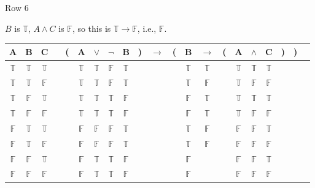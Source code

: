 \documentclass[
  ignorenonframetext,
]{beamer}
\renewcommand{\,}{\text{, }}
\def\True{\mathbb{T}}
\def\False{\mathbb{F}}
\begin{document}
\begin{frame}{Row 6}
\protect\hypertarget{row-6}{}

\(B\) is \(\True\), \(A \wedge C\) is \(\False\), so this is
\(\True \rightarrow \False\), i.e., \(\False\).

\begin{center}
\bigskip
\begin{tabular}{@{ }c@{ }@{ }c@{ }@{ }c | c@{ }@{}c@{}@{ }c@{ }@{ }c@{ }@{ }c@{ }@{ }c@{ }@{}c@{}@{ }c@{ }@{}c@{}@{ }c@{ }@{ }c@{ }@{}c@{}@{ }c@{ }@{ }c@{ }@{ }c@{ }@{}c@{}@{}c@{}@{ }c}
A & B & C &  & ( & A & $\vee$ & $\neg$ & B & ) & $\rightarrow$ & ( & B & $\rightarrow$ & ( & A & $\wedge$ & C & ) & ) & \\
\hline 
 $\True$ & $\True$ & $\True$ &  &  & $\True$ & $\True$ & $\False$ & $\True$ &  &&  & $\True$ & $\True$ &  & $\True$ & $\True$ & $\True$ &  &  & \\
 $\True$ & $\True$ & $\False$ &  &  & $\True$ & $\True$ & $\False$ & $\True$ &  &&  & $\True$ & $\False$ &  & $\True$ & $\False$ & $\False$ &  &  & \\
 $\True$ & $\False$ & $\True$ &  &  & $\True$ & $\True$ & $\True$ & $\False$ &  &&  & $\False$ & $\True$ &  & $\True$ & $\True$ & $\True$ &  &  & \\
 $\True$ & $\False$ & $\False$ &  &  & $\True$ & $\True$ & $\True$ & $\False$ &  &&  & $\False$ & $\True$ &  & $\True$ & $\False$ & $\False$ &  &  & \\
 $\False$ & $\True$ & $\True$ &  &  & $\False$ & $\False$ & $\False$ & $\True$ &  &&  & $\True$ & $\False$ &  & $\False$ & $\False$ & $\True$ &  &  & \\
 $\False$ & $\True$ & $\False$ &  &  & $\False$ & $\False$ & $\False$ & $\True$ &  &&  & $\True$ & $\False$ &  & $\False$ & $\False$ & $\False$ &  &  & \\
 $\False$ & $\False$ & $\True$ &  &  & $\False$ & $\True$ & $\True$ & $\False$ &  &&  & $\False$ &&  & $\False$ & $\False$ & $\True$ &  &  & \\
 $\False$ & $\False$ & $\False$ &  &  & $\False$ & $\True$ & $\True$ & $\False$ &  &&  & $\False$ &&  & $\False$ & $\False$ & $\False$ &  &  & \\
\end{tabular}
\bigskip
\end{center}

\end{frame}
\end{document}
